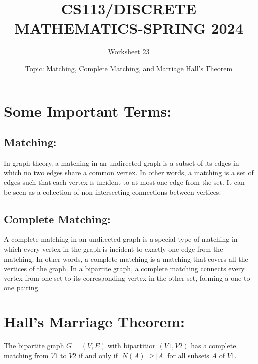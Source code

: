 \documentclass{exam}
\title{CS113/DISCRETE MATHEMATICS-SPRING 2024}
\author{Worksheet 23}
\date{Topic: Matching, Complete Matching, and Marriage Hall's Theorem}
\begin{document}
\maketitle
\vspace{5mm}
\begin{center}
\end{center}
\vspace{5mm}


\vspace{5mm}

\vspace{5mm}

\section{Some Important Terms:}
\subsection{Matching:}
In graph theory, a matching in an undirected graph is a subset of its edges in which no two edges share a common vertex. In other words, a matching is a set of edges such that each vertex is incident to at most one edge from the set. It can be seen as a collection of non-intersecting connections between vertices.

\subsection{Complete Matching:} 
A complete matching in an undirected graph is a special type of matching in which every vertex in the graph is incident to exactly one edge from the matching. In other words, a complete matching is a matching that covers all the vertices of the graph. In a bipartite graph, a complete matching connects every vertex from one set to its corresponding vertex in the other set, forming a one-to-one pairing.

\section{Hall's Marriage Theorem:}
The bipartite graph \( G = (V, E) \) with bipartition \((V1, V2)\) has a complete matching from \( V1 \) to \( V2 \) if and only if \( |N(A)| \geq |A| \) for all subsets \( A \) of \( V1 \).
\newpage
\end{document}
